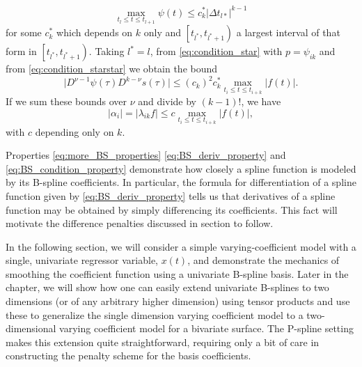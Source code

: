 \documentclass[12pt]{article}
\newcommand*\needsparaphrased{\color{red}}
\theoremstyle{definition}
\begin{document}
\begin{enumerate}
\begin{description}
\begin{equation}\label{eq:condition_starstarstar}
\max \limits_{t_l \le t \le t_{l+1}} \psi\left(t\right) \le c^*_k\vert \Delta t_{l*}\vert^{k-1}
\end{equation}
 for some $c_k^*$ which depends on $k$ only and $\left[t_{l^*},t_{l^*+1}\right)$ a largest interval of that form in $\left[t_{l^*},t_{l^*+1}\right)$. Taking $l^*=l$, from \ref{eq:condition_star} with $p = \psi_{ik}$ and from \ref{eq:condition_starstar} we obtain the bound 
 \[
 \vert D^{\nu-1}\psi\left(\tau\right)D^{k-\nu}s\left(\tau\right) \vert \le \left(c_k\right)^2c_k^* \max \limits_{t_i \le t\le t_{i+k}}\vert f\left(t\right)\vert.
 \]
 If we sum these bounds over $\nu$ and divide by $\left(k-1\right)!$, we have
 \[
 \vert \alpha_i \vert = \vert \lambda_{ik} f \vert \le c \max \limits_{t_i \le t\le t_{i+k}}\vert f\left(t\right)\vert,
 \]
 with $c$ depending only on $k$.
 
\end{description}

Properties \ref{eq:more_BS_properties} \ref{eq:BS_deriv_property} and  \ref{eq:BS_condition_property} demonstrate how closely a spline function is modeled by its B-spline coefficients. In particular, the formula for differentiation of a spline function given by \ref{eq:BS_deriv_property} tells us that derivatives of a spline function may be obtained by simply differencing its coefficients. This fact will motivate the difference penalties discussed in section {\needsparaphrased{P-spline penalties}} to follow.
 
\end{enumerate}

In the following section, we will consider a simple varying-coefficient model with a single, univariate regressor variable, $x\left(t\right)$, and demonstrate the mechanics of smoothing the coefficient function using a univariate B-spline basis. Later in the chapter, we will show how one can easily extend univariate B-splines to two dimensions (or of any arbitrary higher dimension) using tensor products and use these to generalize the single dimension varying coefficient model to a two-dimensional varying coefficient model for a bivariate surface. The P-spline setting  makes this extension quite straightforward, requiring only a bit of care in constructing the penalty scheme for the basis coefficients. 







\end{document}
